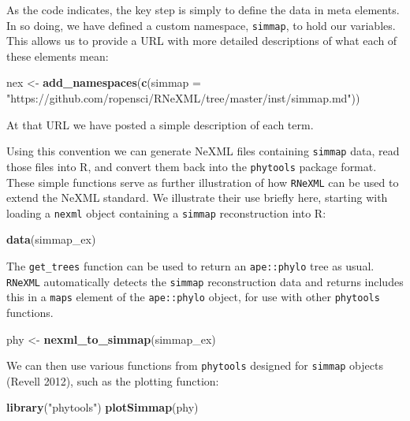 \documentclass[author-year, review, 11pt]{components/elsarticle} %
\newenvironment{Shaded}{\begin{snugshade}}{\end{snugshade}}
\newcommand{\KeywordTok}[1]{\textcolor[rgb]{0.13,0.29,0.53}{\textbf{{#1}}}}
\newcommand{\DataTypeTok}[1]{\textcolor[rgb]{0.13,0.29,0.53}{{#1}}}
\newcommand{\StringTok}[1]{\textcolor[rgb]{0.31,0.60,0.02}{{#1}}}
\newcommand{\NormalTok}[1]{{#1}}
\begin{document}
As the code indicates, the key step is simply to define the data in meta
elements. In so doing, we have defined a custom namespace,
\texttt{simmap}, to hold our variables. This allows us to provide a URL
with more detailed descriptions of what each of these elements mean:

\begin{Shaded}
\begin{Highlighting}[]
\NormalTok{nex <-}\StringTok{ }\KeywordTok{add_namespaces}\NormalTok{(}\KeywordTok{c}\NormalTok{(}\DataTypeTok{simmap =} \StringTok{"https://github.com/ropensci/RNeXML/tree/master/inst/simmap.md"}\NormalTok{))}
\end{Highlighting}
\end{Shaded}

At that URL we have posted a simple description of each term.

Using this convention we can generate NeXML files containing
\texttt{simmap} data, read those files into R, and convert them back
into the \texttt{phytools} package format. These simple functions serve
as further illustration of how \texttt{RNeXML} can be used to extend the
NeXML standard. We illustrate their use briefly here, starting with
loading a \texttt{nexml} object containing a \texttt{simmap}
reconstruction into R:

\begin{Shaded}
\begin{Highlighting}[]
\KeywordTok{data}\NormalTok{(simmap_ex)}
\end{Highlighting}
\end{Shaded}

The \texttt{get\_trees} function can be used to return an
\texttt{ape::phylo} tree as usual. \texttt{RNeXML} automatically detects
the \texttt{simmap} reconstruction data and returns includes this in a
\texttt{maps} element of the \texttt{ape::phylo} object, for use with
other \texttt{phytools} functions.

\begin{Shaded}
\begin{Highlighting}[]
\NormalTok{phy <-}\StringTok{ }\KeywordTok{nexml_to_simmap}\NormalTok{(simmap_ex)}
\end{Highlighting}
\end{Shaded}

We can then use various functions from \texttt{phytools} designed for
\texttt{simmap} objects (Revell 2012), such as the plotting function:

\begin{Shaded}
\begin{Highlighting}[]
\KeywordTok{library}\NormalTok{(}\StringTok{"phytools"}\NormalTok{)}
\KeywordTok{plotSimmap}\NormalTok{(phy)}
\end{Highlighting}
\end{Shaded}
\end{document}
